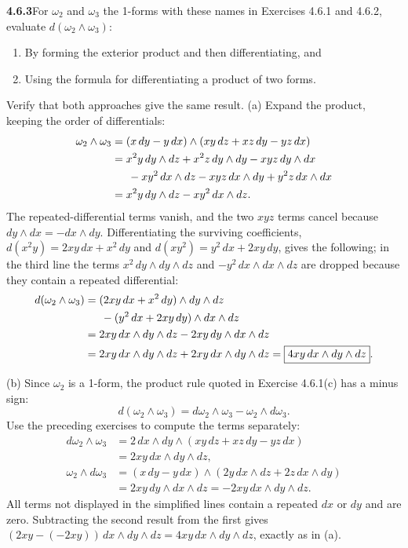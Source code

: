 \par\bigskip
\noindent\textbf{4.6.3}\quad For $\omega_{2}$ and $\omega_{3}$ the 1-forms
with these names in Exercises 4.6.1 and 4.6.2, evaluate
$d(\omega_{2}\wedge\omega_{3})$:
\begin{enumerate}
\item[(a)] By forming the exterior product and then differentiating, and
\item[(b)] Using the formula for differentiating a product of two forms.
\end{enumerate}
Verify that both approaches give the same result.
\solution
(a) Expand the product, keeping the order of differentials:
\begin{align*}
\omega_2\wedge\omega_3
&=(x\,dy-y\,dx)\wedge(xy\,dz+xz\,dy-yz\,dx)\\
&=x^2y\,dy\wedge dz+x^2z\,dy\wedge dy
 -xyz\,dy\wedge dx\\
&\hspace{1.5em}-xy^2\,dx\wedge dz-xyz\,dx\wedge dy
 +y^2z\,dx\wedge dx\\
&=x^2y\,dy\wedge dz-xy^2\,dx\wedge dz.
\end{align*}
The repeated-differential terms vanish, and the two $xyz$ terms cancel
because $dy\wedge dx=-dx\wedge dy$. Differentiating the surviving
coefficients, $d(x^2y)=2xy\,dx+x^2\,dy$ and $d(xy^2)=y^2\,dx+2xy\,dy$,
gives the following; in the third line the terms
$x^2\,dy\wedge dy\wedge dz$ and $-y^2\,dx\wedge dx\wedge dz$ are dropped
because they contain a repeated differential:
\begin{align*}
d(\omega_2\wedge\omega_3)
&=(2xy\,dx+x^2\,dy)\wedge dy\wedge dz\\
&\hspace{1.5em}-(y^2\,dx+2xy\,dy)\wedge dx\wedge dz\\
&=2xy\,dx\wedge dy\wedge dz-2xy\,dy\wedge dx\wedge dz\\
&=2xy\,dx\wedge dy\wedge dz+2xy\,dx\wedge dy\wedge dz
=\boxed{4xy\,dx\wedge dy\wedge dz}.
\end{align*}

(b) Since $\omega_2$ is a 1-form, the product rule quoted in
Exercise 4.6.1(c) has a minus sign:
\[
d(\omega_2\wedge\omega_3)
=d\omega_2\wedge\omega_3-\omega_2\wedge d\omega_3.
\]
Use the preceding exercises to compute the terms separately:
\begin{align*}
d\omega_2\wedge\omega_3
&=2\,dx\wedge dy\wedge(xy\,dz+xz\,dy-yz\,dx)\\
&=2xy\,dx\wedge dy\wedge dz,\\
\omega_2\wedge d\omega_3
&=(x\,dy-y\,dx)\wedge(2y\,dx\wedge dz+2z\,dx\wedge dy)\\
&=2xy\,dy\wedge dx\wedge dz
=-2xy\,dx\wedge dy\wedge dz.
\end{align*}
All terms not displayed in the simplified lines contain a repeated
$dx$ or $dy$ and are zero. Subtracting the second result from the first
gives $(2xy-(-2xy))\,dx\wedge dy\wedge dz=4xy\,dx\wedge dy\wedge dz$,
exactly as in (a).

